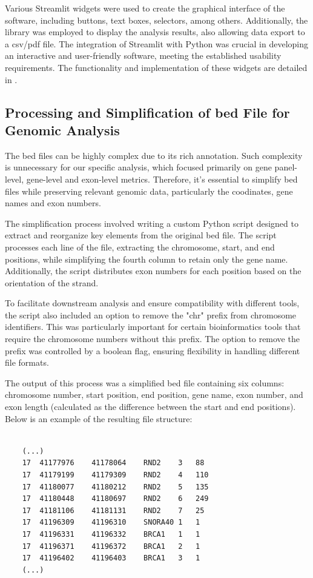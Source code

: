 Various Streamlit widgets were used to create the graphical interface of the software, including buttons, text boxes, selectors, among others. Additionally, the library was employed to display the analysis results, also allowing data export to a \ac{csv}/\ac{pdf} file. The integration of Streamlit with Python was crucial in developing an interactive and user-friendly software, meeting the established usability requirements. The functionality and implementation of these widgets are detailed in \cite{streamlit_doc}.

\subsection{Processing and Simplification of \ac{bed} File for Genomic Analysis}

The \ac{bed} files can be highly complex due to its rich annotation. Such complexity is unnecessary for our specific analysis, which focused primarily on gene panel-level, gene-level and exon-level metrics. Therefore, it's essential to simplify \ac{bed} files while preserving relevant genomic data, particularly the coodinates, gene names and exon numbers.

The simplification process involved writing a custom Python script designed to extract and reorganize key elements from the original \ac{bed} file. The script processes each line of the file, extracting the chromosome, start, and end positions, while simplifying the fourth column to retain only the gene name. Additionally, the script distributes exon numbers for each position based on the orientation of the strand.

To facilitate downstream analysis and ensure compatibility with different tools, the script also included an option to remove the "chr" prefix from chromosome identifiers. This was particularly important for certain bioinformatics tools that require the chromosome numbers without this prefix. The option to remove the prefix was controlled by a boolean flag, ensuring flexibility in handling different file formats.

The output of this process was a simplified \ac{bed} file containing six columns: chromosome number, start position, end position, gene name, exon number, and exon length (calculated as the difference between the start and end positions). Below is an example of the resulting file structure:

\begin{verbatim}
    
    (...)
    17	41177976	41178064	RND2	3	88
    17	41179199	41179309	RND2	4	110
    17	41180077	41180212	RND2	5	135
    17	41180448	41180697	RND2	6	249
    17	41181106	41181131	RND2	7	25
    17	41196309	41196310	SNORA40	1	1
    17	41196331	41196332	BRCA1	1	1
    17	41196371	41196372	BRCA1	2	1
    17	41196402	41196403	BRCA1	3	1
    (...)
\end{verbatim}

